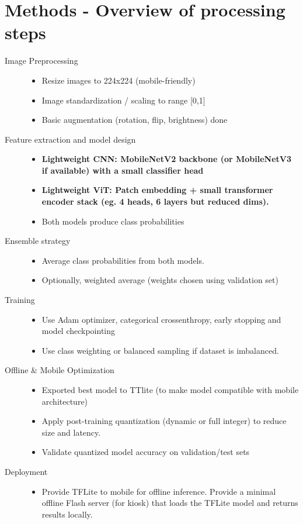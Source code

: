 \section{Methods - Overview of processing steps}
\begin{description}
	\item[Image Preprocessing] 
		\begin{itemize}
			\item Resize images to 224x224  (mobile-friendly)
			\item Image standardization / scaling to range [0,1]
			\item Basic augmentation (rotation, flip, brightness) done
		\end{itemize}
	
	\item[Feature extraction and model design]
		\begin{itemize}
			\item \bfseries{Lightweight CNN:} MobileNetV2 backbone (or MobileNetV3 if available) with a small classifier head
			\item \bfseries{Lightweight ViT:} Patch embedding + small transformer encoder stack (eg. 4 heads, 6 layers but reduced dims).
			\item Both models produce class probabilities
		\end{itemize}
	\item[Ensemble strategy]
		\begin{itemize}
			\item Average class probabilities from both models.
			\item  Optionally, weighted average (weights chosen using validation set)
		\end{itemize} 
	\item[Training] 
		\begin{itemize}
			\item Use Adam optimizer, categorical crossenthropy, early stopping and model checkpointing
			\item Use class weighting or balanced sampling if dataset is imbalanced.
		\end{itemize}
	\item[Offline \& Mobile Optimization]
		\begin{itemize}
			\item Exported best model to TTlite (to make model compatible with mobile architecture)
			\item Apply post-training quantization (dynamic or full integer) to reduce size and latency.
			\item Validate quantized model accuracy on validation/test sets
		\end{itemize}
	\item[Deployment]
		\begin{itemize}
			\item Provide TFLite to mobile for offline inference.
			Provide a minimal offline Flash server (for kiosk) that loads the TFLite model and returns results locally.
		\end{itemize}
\end{description}

